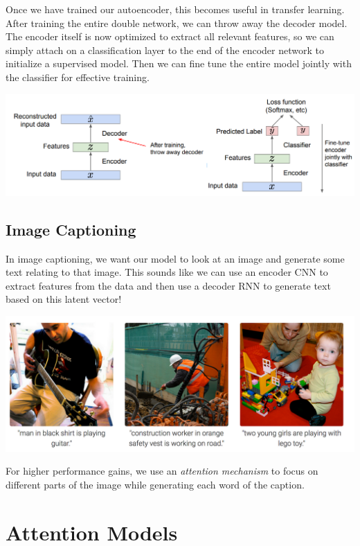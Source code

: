 \documentclass{article}
\theoremstyle{definition}
\theoremstyle{remark}
\theoremstyle{definition}
\begin{document}
Once we have trained our autoencoder, this becomes useful in transfer learning. After training the entire double network, we can throw away the decoder model. The encoder itself is now optimized to extract all relevant features, so we can simply attach on a classification layer to the end of the encoder network to initialize a supervised model. Then we can fine tune the entire model jointly with the classifier for effective training. 
\begin{center}
    \includegraphics[scale=0.33]{img/transfer_autoencoder.png}
\end{center}

\subsection{Image Captioning}

In image captioning, we want our model to look at an image and generate some text relating to that image. This sounds like we can use an encoder CNN to extract features from the data and then use a decoder RNN to generate text based on this latent vector! 
\begin{center}
    \includegraphics[scale=0.3]{img/image_captioning.png}
\end{center}
For higher performance gains, we use an \textit{attention mechanism} to focus on different parts of the image while generating each word of the caption. 


\section{Attention Models}
\end{document}
